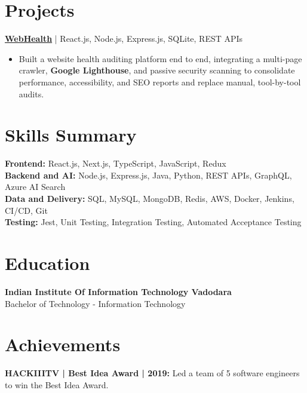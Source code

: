 \documentclass[a4paper,10pt]{article}
\begin{document}
\section{Projects}
\textbf{\href{https://web-health-eta.vercel.app/}{WebHealth}} | React.js, Node.js, Express.js, SQLite, REST APIs
\begin{itemize}
\item Built a website health auditing platform end to end, integrating a multi-page crawler, \textbf{Google Lighthouse}, and passive security scanning to consolidate performance, accessibility, and SEO reports and replace manual, tool-by-tool audits.
\end{itemize}

\section{Skills Summary}
\textbf{Frontend:} React.js, Next.js, TypeScript, JavaScript, Redux\\
\textbf{Backend and AI:} Node.js, Express.js, Java, Python, REST APIs, GraphQL, Azure AI Search\\
\textbf{Data and Delivery:} SQL, MySQL, MongoDB, Redis, AWS, Docker, Jenkins, CI/CD, Git\\
\textbf{Testing:} Jest, Unit Testing, Integration Testing, Automated Acceptance Testing

\section{Education}
\textbf{Indian Institute Of Information Technology Vadodara}\\
Bachelor of Technology - Information Technology

\section{Achievements}
\textbf{HACKIIITV | Best Idea Award | 2019:} Led a team of 5 software engineers to win the Best Idea Award.
\end{document}
